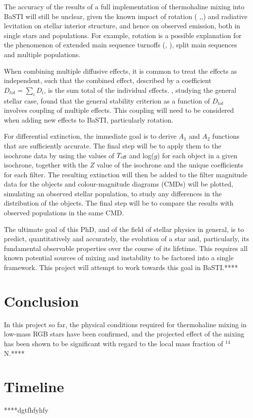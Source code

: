 \documentclass[12pt, a4paper]{report}
\begin{document}
The accuracy of the results of a full implementation of thermohaline mixing into BaSTI will still be unclear, given the known impact of rotation (\cite{1963ApJ...138.1134C} \cite{1998A&A...334.1000M},\cite{2017A&A...606A..55M},\cite{2012A&A...537A.146E}) and radiative levitation \citep{2016A&A...592A..29M} on stellar interior structure, and hence on observed emission, both in single stars  and populations. For example, rotation is a possible explanation for the phenomenon of extended main sequence turnoffs (\cite{2015MNRAS.453.2070N}, \cite{2016MNRAS.460L..20B}), split main sequences and multiple populations.

When combining multiple diffusive effects, it is common to treat the effects as independent, such that the combined effect, described by a coefficient $D_{tot} = \sum_{i} D_{i}$, is the sum total of the individual effects. \cite{2013A&A...553A...1M}, studying the general stellar case, found that the general stability criterion as a function of $D_{tot}$ involves coupling of multiple effects. This coupling will need to be considered when adding new effects to BaSTI, particularly rotation.

For differential extinction, the immediate goal is to derive $A_{1}$ and $A_{2}$ functions that are  sufficiently accurate. The final step will be to apply them to the isochrone data by using the values of $T_{\textnormal{eff}}$ and log($g$) for each object in a given isochrone, together with the $Z$ value of the isochrone and the unique coefficients for each filter. The resulting extinction will then be added to the filter magnitude data for the objects and colour-magnitude diagrams (CMDs) will be plotted, simulating an observed stellar population, to study any differences in the distribution of the objects. The final step will be to compare the results with observed populations in the same CMD.

The ultimate goal of this PhD, and of the field of stellar physics in general, is to predict, quantitatively and accurately, the evolution of a star and, particularly, its fundamental observable properties over the course of its lifetime. This requires all known potential sources of mixing and instability to be factored into a single framework. This project will attempt to work towards this goal in BaSTI.****

\chapter{Conclusion}
In this project so far, the physical conditions required for thermohaline mixing in low-mass RGB stars have been confirmed, and the projected effect of the mixing has been shown to be significant with regard to the local mass fraction of $^{14}$N.****

\chapter{Timeline}
****dgtfhfyhfy


\end{document}
